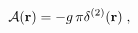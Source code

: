 \begin{equation}
{\mathcal A} ({\bf r})=
- g \,
\pi
\delta^{(2)} ({\bf r})
\;  ,
\label{eq:time_rate_of_dilation_op_ddim_2D_ISP}
\end{equation}

